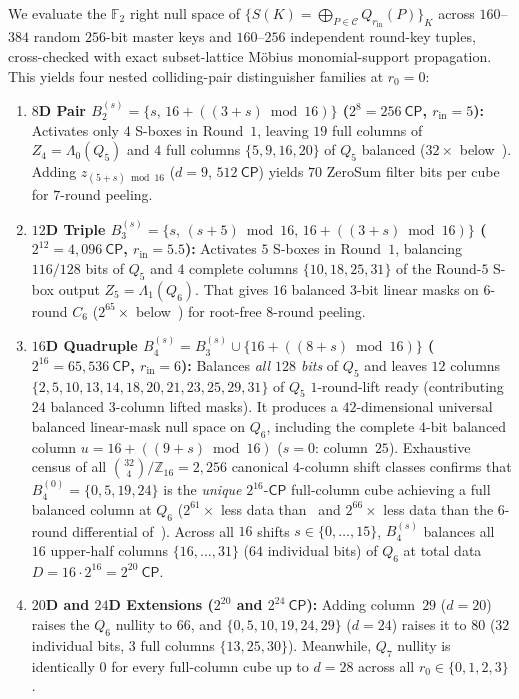 \documentclass[11pt,a4paper]{article}
\theoremstyle{definition}
\theoremstyle{remark}
\newcommand{\Ftwo}{\mathbb{F}_2}
\newcommand{\CP}{\mathsf{CP}}
\begin{document}
We evaluate the $\Ftwo$ right null space of $\{S(K) = \bigoplus_{P \in \mathcal{C}} Q_{r_{\text{in}}}(P)\}_K$ across $160$--$384$ random $256$-bit master keys and $160$--$256$ independent round-key tuples, cross-checked with exact subset-lattice M\"{o}bius monomial-support propagation. This yields four nested colliding-pair distinguisher families at $r_0 = 0$:
\begin{enumerate}[leftmargin=1.8em]
    \item \textbf{$8$D Pair $B_2^{(s)} = \{s,\, 16{+}((3{+}s)\bmod 16)\}$ ($2^8 = 256~\CP$, $r_{\text{in}} = 5$):} Activates only $4$ S-boxes in Round~$1$, leaving $19$ full columns of $Z_4 = \Lambda_0(Q_5)$ and $4$ full columns $\{5, 9, 16, 20\}$ of $Q_5$ balanced ($32\times$ below~\cite{KKL24}). Adding $z_{(5+s)\bmod 16}$ ($d = 9$, $512~\CP$) yields $70$ ZeroSum filter bits per cube for $7$-round peeling.
    \item \textbf{$12$D Triple $B_3^{(s)} = \{s,\, (s{+}5)\bmod 16,\, 16{+}((3{+}s)\bmod 16)\}$ ($2^{12} = 4{,}096~\CP$, $r_{\text{in}} = 5.5$):} Activates $5$ S-boxes in Round~$1$, balancing $116/128$ bits of $Q_5$ and $4$ complete columns $\{10, 18, 25, 31\}$ of the Round-$5$ S-box output $Z_5 = \Lambda_1(Q_6)$. That gives $16$ balanced $3$-bit linear masks on $6$-round $C_6$ ($2^{65}\times$ below~\cite{KKL24}) for root-free $8$-round peeling.
    \item \textbf{$16$D Quadruple $B_4^{(s)} = B_3^{(s)} \cup \{16{+}((8{+}s)\bmod 16)\}$ ($2^{16} = 65{,}536~\CP$, $r_{\text{in}} = 6$):} Balances \emph{all $128$ bits} of $Q_5$ and leaves $12$ columns $\{2,5,10,13,14,18,20,21,23,25,29,31\}$ of $Q_5$ $1$-round-lift ready (contributing $24$ balanced $3$-column lifted masks). It produces a $42$-dimensional universal balanced linear-mask null space on $Q_6$, including the complete $4$-bit balanced column $u = 16 + ((9 + s)\bmod 16)$ ($s = 0$: column~$25$). Exhaustive census of all $\binom{32}{4}/\mathbb{Z}_{16} = 2{,}256$ canonical $4$-column shift classes confirms that $B_4^{(0)} = \{0, 5, 19, 24\}$ is the \emph{unique} $2^{16}\text{-}\CP$ full-column cube achieving a full balanced column at $Q_6$ ($2^{61}\times$ less data than~\cite{KKL24} and $2^{66}\times$ less data than the $6$-round differential of~\cite[Appendix~A]{BNS26}). Across all $16$ shifts $s \in \{0,\dots,15\}$, $B_4^{(s)}$ balances all $16$ upper-half columns $\{16,\dots,31\}$ ($64$ individual bits) of $Q_6$ at total data $D = 16 \cdot 2^{16} = 2^{20}~\CP$.
    \item \textbf{$20$D and $24$D Extensions ($2^{20}$ and $2^{24}~\CP$):} Adding column~$29$ ($d = 20$) raises the $Q_6$ nullity to $66$, and $\{0,5,10,19,24,29\}$ ($d = 24$) raises it to $80$ ($32$ individual bits, $3$ full columns $\{13,25,30\}$). Meanwhile, $Q_7$ nullity is identically $0$ for every full-column cube up to $d = 28$ across all $r_0 \in \{0,1,2,3\}$.
\end{enumerate}
\end{document}
